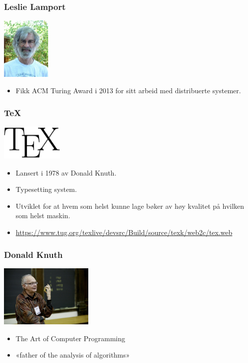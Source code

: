 \documentclass[10pt]{beamer}
\begin{document}
\begin{frame}\frametitle{Leslie Lamport}

\begin{center}
\includegraphics[height=3cm]{img/lamport.jpg}
\end{center}

\begin{itemize}
	\item
	Fikk ACM Turing Award i 2013 for sitt arbeid med distribuerte systemer.
\end{itemize}
\end{frame}

\begin{frame}\frametitle{\TeX}

\begin{center}
\includegraphics[width=3cm]{img/texlogo.png}
\end{center}

\begin{itemize}
	\item
	Lansert i 1978 av Donald Knuth.
	\item
	Typesetting system.
	\item
	Utviklet for at hvem som helst kunne lage bøker av høy kvalitet på hvilken som helst maskin.
	\item
	\url{https://www.tug.org/texlive/devsrc/Build/source/texk/web2c/tex.web}
\end{itemize}
\end{frame}

\begin{frame}\frametitle{Donald Knuth}

\begin{center}
\includegraphics[height=3cm]{img/knuth.jpg}
\end{center}

\begin{itemize}
	\item
	The Art of Computer Programming
	\item
	«father of the analysis of algorithms»
\end{itemize}
\end{frame}
\end{document}
